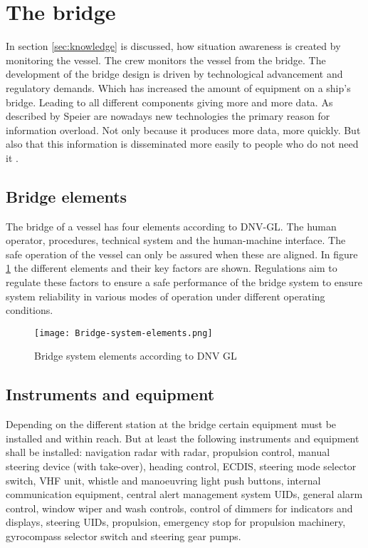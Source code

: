 \section{The bridge}
In section \ref{sec:knowledge} is discussed, how situation awareness is created by monitoring the vessel. The crew monitors the vessel from the bridge. The development of the bridge design is driven by technological advancement and regulatory demands. Which has increased the amount of equipment on a ship's bridge. Leading to all different components giving more and more data. As described by Speier are nowadays new technologies the primary reason for information overload. Not only because it produces more data, more quickly. But also that this information is disseminated more easily to people who do not need it \cite{Speier1999}. 

\subsection{Bridge elements}
The bridge of a vessel has four elements according to DNV-GL. The human operator, procedures, technical system and the human-machine interface. The safe operation of the vessel can only be assured when these are aligned. In figure \ref{fig:Bridge-system-elements} the different elements and their key factors are shown. Regulations aim to regulate these factors to ensure a safe performance of the bridge system to ensure system reliability in various modes of operation under different operating conditions. \cite{DNVGL2011}

\begin{figure}[hb]
	\centering
	\texttt{[image: Bridge-system-elements.png]}
	\caption{Bridge system elements according to DNV GL}
	\label{fig:Bridge-system-elements}
\end{figure}

\subsection{Instruments and equipment}
Depending on the different station at the bridge certain equipment must be installed and within reach. But at least the following instruments and equipment shall be installed: navigation radar with radar, propulsion control, manual steering device (with take-over), heading control, \ac{ECDIS}, steering mode selector switch, \ac{VHF} unit, whistle and manoeuvring light push buttons, internal communication equipment, central alert management system \ac{UID}s, general alarm control, window wiper and wash controls, control of dimmers for indicators and displays, steering \ac{UID}s, propulsion, emergency stop for propulsion machinery, gyrocompass selector switch and steering gear pumps.

